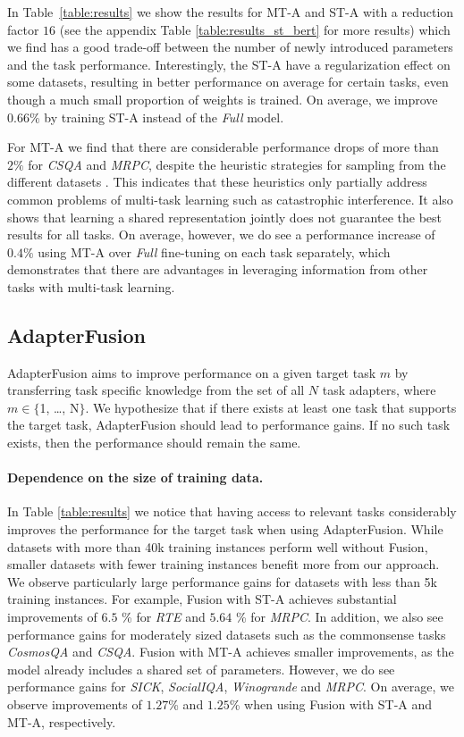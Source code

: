 In Table~\ref{table:results} we show the results for MT-A and ST-A with a reduction factor $16$ (see the appendix Table \ref{table:results_st_bert} for more results) which we find has a good trade-off between the number of newly introduced parameters and the task performance. Interestingly, the ST-A have a regularization effect on some datasets, resulting in better performance on average for certain tasks, even though a much small proportion of weights is trained. On average, we improve $0.66\%$ by training ST-A instead of the \textit{Full} model. 

For MT-A we find that there are considerable performance drops of more than $2\%$ for \textit{CSQA} and \textit{MRPC}, despite the heuristic strategies for sampling from the different datasets \citep{stickland2019bert}. This indicates that these heuristics only partially address common problems of multi-task learning such as catastrophic interference. It also shows that learning a shared representation jointly does not guarantee the best results for all tasks.  On average, however, we do see a performance increase of $0.4\%$ using MT-A over
\textit{Full} fine-tuning on each task separately, which demonstrates that there are advantages in leveraging information from other tasks with multi-task learning. 

\subsection{AdapterFusion}
\label{sec:results:fusion}
AdapterFusion aims to improve performance on a given target task $m$ by transferring task specific knowledge from the set of all $N$ task adapters, where $m \in \{$1, \ldots, N$\}$.
We hypothesize that if there exists at least one task that supports the target task,  AdapterFusion should lead to performance gains. If no such task exists, then the performance should remain the same.

\newcommand{\STAB}[1]{}

\paragraph{Dependence on the size of training data.} In Table \ref{table:results} we notice that having access to relevant tasks considerably improves the performance for the target task when using AdapterFusion. While datasets with more than 40k training instances  perform well without Fusion, smaller datasets with fewer training instances benefit more from our approach. We observe particularly large performance gains for datasets with less than 5k training instances. For example, Fusion with ST-A achieves substantial improvements of $6.5$ \% for \textit{RTE} and $5.64$ \% for \textit{MRPC}. In addition, we also see performance gains for moderately sized datasets such as the commonsense tasks \textit{CosmosQA} and \textit{CSQA}. Fusion with MT-A achieves smaller improvements, as the model already includes a shared set of parameters. However, we do see performance gains for \textit{SICK}, \textit{SocialIQA}, \textit{Winogrande} and \textit{MRPC}.   
On average, we observe improvements of $1.27$\% and $1.25$\% when using Fusion with ST-A and MT-A, respectively. 

